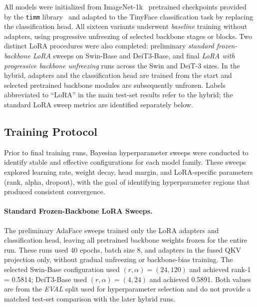 \documentclass[runningheads,a4paper]{llncs}
\begin{document}
All models were initialized from ImageNet-1k~\cite{russakovsky2015imagenet} pretrained checkpoints provided by the \texttt{timm} library~\cite{wightman2019timm} and adapted to the TinyFace classification task by replacing the classification head. All sixteen variants underwent \emph{baseline} training without adapters, using progressive unfreezing of selected backbone stages or blocks. Two distinct LoRA procedures were also completed: preliminary \emph{standard frozen-backbone LoRA} sweeps on Swin-Base and DeiT3-Base, and final \emph{LoRA with progressive backbone unfreezing} runs across the Swin and DeiT-3 sizes. In the hybrid, adapters and the classification head are trained from the start and selected pretrained backbone modules are subsequently unfrozen. Labels abbreviated to ``LoRA'' in the main test-set results refer to the hybrid; the standard LoRA sweep metrics are identified separately below.

\subsection{Training Protocol}\label{sec:training-protocol}
Prior to final training runs, Bayesian hyperparameter sweeps were conducted to identify stable and effective configurations for each model family. These sweeps explored learning rate, weight decay, head margin, and LoRA-specific parameters (rank, alpha, dropout), with the goal of identifying hyperparameter regions that produced consistent convergence.

\paragraph{Standard Frozen-Backbone LoRA Sweeps.}
The preliminary AdaFace sweeps trained only the LoRA adapters and classification head, leaving all pretrained backbone weights frozen for the entire run. These runs used 40 epochs, batch size 8, and adapters in the fused QKV projection only, without gradual unfreezing or backbone-bias training. The selected Swin-Base configuration used $(r,\alpha)=(24,120)$ and achieved rank-1 = 0.5814; DeiT3-Base used $(r,\alpha)=(4,24)$ and achieved 0.5891. Both values are from the \emph{EVAL} split used for hyperparameter selection and do not provide a matched test-set comparison with the later hybrid runs.
\end{document}
